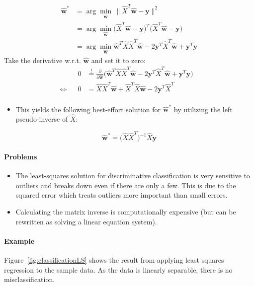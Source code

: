 \documentclass[a4paper, 11pt, accentcolor = tud3b]{tudreport}
\renewcommand{\vec}[1]{\mathbf{#1}}
\begin{document}
				\begin{align} %
					\hat{\vec{w}}^\ast &= \arg\min\limits_{\hat{\vec{w}}} \, \lVert \hat{X}^T \hat{\vec{w}} - \vec{y} \rVert^2 \\
									   &= \arg\min\limits_{\hat{\vec{w}}} \big( \hat{X}^T \hat{\vec{w}} - \vec{y} \big)^T \big( \hat{X}^T \hat{\vec{w}} - \vec{y} \big) \\
									   &= \arg\min\limits_{\hat{\vec{w}}} \hat{\vec{w}}^T \hat{X} \hat{X}^T \hat{\vec{w}} - 2\vec{y}^T\hat{X}^T\hat{\vec{w}} + \vec{y}^T\vec{y}
				\end{align}
				Take the derivative w.r.t. \( \hat{\vec{w}} \) and set it to zero:
				\begin{align}
					&& 0 &\overset{!}{=} \frac{\partial}{\partial \hat{\vec{w}}} \big( \hat{\vec{w}}^T \hat{X} \hat{X}^T \hat{\vec{w}} - 2\vec{y}^T\hat{X}^T\hat{\vec{w}} + \vec{y}^T\vec{y} \big) & \\
					\iff && 0 &= \hat{X} \hat{X}^T \hat{\vec{w}} + \hat{X}^T \hat{X} \hat{\vec{w}} - 2\vec{y}^T\hat{X}^T & \\
				\end{align}
				\begin{itemize}
					\item This yields the following best-effort solution for \( \hat{\vec{w}}^\ast \) by utilizing the left pseudo-inverse of \(\hat{X}\):
				\end{itemize}
				\begin{equation}
					\hat{\vec{w}}^\ast = \big( \hat{X} \hat{X}^T \big)^{-1} \hat{X} \vec{y}
				\end{equation}

				\paragraph{Problems}
					\begin{itemize}
						\item The least-squares solution for discriminative classification is very sensitive to outliers and breaks down even if there are only a few. This is due to the squared error which treats outliers more important than small errors.
						\item Calculating the matrix inverse is computationally expensive (but can be rewritten as solving a linear equation system).
					\end{itemize}
				
				\paragraph{Example}
					Figure~\ref{fig:classificationLS} shows the result from applying least squares regression to the sample data. As the data is linearly separable, there is no misclassification.
					
\end{document}
